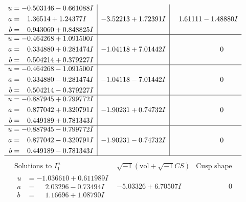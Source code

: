 \documentclass[1p]{elsarticle_modified}
\theoremstyle{definition}
\newcommand{\I}{\sqrt{-1}}
\begin{document}
$$\begin{array}{c|c|c}
\begin{aligned}
u &= -0.503146 - 0.661088 I \\
a &= \phantom{-}1.36514 + 1.24377 I \\
b &= \phantom{-}0.943060 + 0.848825 I\end{aligned}
 & -3.52213 + 1.72391 I & \phantom{-}1.61111 - 1.48880 I \\ \hline\begin{aligned}
u &= -0.464268 + 1.091500 I \\
a &= \phantom{-}0.334880 + 0.281474 I \\
b &= \phantom{-}0.504214 + 0.379227 I\end{aligned}
 & -1.04118 + 7.01442 I & \phantom{-0.000000 } 0 \\ \hline\begin{aligned}
u &= -0.464268 - 1.091500 I \\
a &= \phantom{-}0.334880 - 0.281474 I \\
b &= \phantom{-}0.504214 - 0.379227 I\end{aligned}
 & -1.04118 - 7.01442 I & \phantom{-0.000000 } 0 \\ \hline\begin{aligned}
u &= -0.887945 + 0.799772 I \\
a &= \phantom{-}0.877042 + 0.320791 I \\
b &= \phantom{-}0.449189 + 0.781343 I\end{aligned}
 & -1.90231 + 0.74732 I & \phantom{-0.000000 } 0 \\ \hline\begin{aligned}
u &= -0.887945 - 0.799772 I \\
a &= \phantom{-}0.877042 - 0.320791 I \\
b &= \phantom{-}0.449189 - 0.781343 I\end{aligned}
 & -1.90231 - 0.74732 I & \phantom{-0.000000 } 0\\
 \hline 
 \end{array}$$\newpage$$\begin{array}{c|c|c}  
\text{Solutions to }I^u_{1}& \I (\text{vol} + \sqrt{-1}CS) & \text{Cusp shape}\\
 \hline 
\begin{aligned}
u &= -1.036610 + 0.611989 I \\
a &= \phantom{-}2.03296 - 0.73494 I \\
b &= \phantom{-}1.16696 + 1.08790 I\end{aligned}
 & -5.03326 + 6.70507 I & \phantom{-0.000000 } 0 \\ \hline\begin{aligned}

\end{aligned}
\end{array}$$
\end{document}
